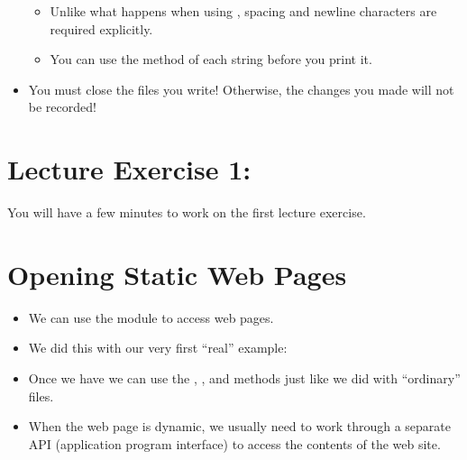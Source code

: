 \documentclass[letterpaper,10pt,english]{sphinxmanual}
\begin{document}
\begin{itemize}
\begin{itemize}
\item {} 
Unlike what happens when using , spacing and newline
characters are required explicitly.

\item {} 
You can use the  method of each string before you
print it.

\end{itemize}

\item {} 
You must close the files you write! Otherwise, the changes you made
will not be recorded!

\begin{sphinxVerbatim}[commandchars=\\\{\}]
\end{sphinxVerbatim}

\end{itemize}


\section{Lecture Exercise 1:}
\label{\detokenize{lecture_notes/lec13_files_web:lecture-exercise-1}}
You will have a few minutes to work on the first lecture exercise.


\section{Opening Static Web Pages}
\label{\detokenize{lecture_notes/lec13_files_web:opening-static-web-pages}}\begin{itemize}
\item {} 
We can use the  module to access web pages.

\item {} 
We did this with our very first “real” example:

\begin{sphinxVerbatim}[commandchars=\\\{\}]
 
  
  
\end{sphinxVerbatim}

\item {} 
Once we have  we can use the , ,
and  methods just like we did with “ordinary” files.

\item {} 
When the web page is dynamic, we usually need to work through a
separate API (application program interface) to access the contents
of the web site.

\end{itemize}
\end{document}
